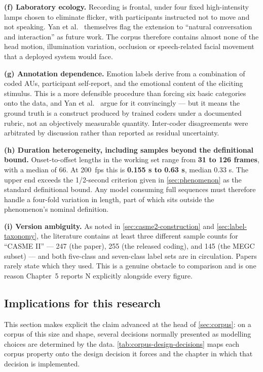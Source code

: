 \textbf{(f) Laboratory ecology.} Recording is frontal, under four fixed high-intensity lamps chosen to eliminate flicker, with participants instructed not to move and not speaking. Yan et al.~\cite{yan2014} themselves flag the extension to ``natural conversation and interaction'' as future work. The corpus therefore contains almost none of the head motion, illumination variation, occlusion or speech-related facial movement that a deployed system would face.

\textbf{(g) Annotation dependence.} Emotion labels derive from a combination of coded AUs, participant self-report, and the emotional content of the eliciting stimulus. This is a more defensible procedure than forcing six basic categories onto the data, and Yan et al.~\cite{yan2014} argue for it convincingly --- but it means the ground truth is a construct produced by trained coders under a documented rubric, not an objectively measurable quantity. Inter-coder disagreements were arbitrated by discussion rather than reported as residual uncertainty.

\textbf{(h) Duration heterogeneity, including samples beyond the definitional bound.} Onset-to-offset lengths in the working set range from \textbf{31 to 126 frames}, with a median of 66. At 200~fps this is \textbf{0.155 s to 0.63 s}, median 0.33 s. The upper end exceeds the 1/2-second criterion given in \autoref{sec:phenomenon} as the standard definitional bound. Any model consuming full sequences must therefore handle a four-fold variation in length, part of which sits outside the phenomenon's nominal definition.

\textbf{(i) Version ambiguity.} As noted in \autoref{sec:casme2-construction} and \autoref{sec:label-taxonomy}, the literature contains at least three different sample counts for ``CASME II'' --- 247 (the paper), 255 (the released coding), and 145 (the MEGC subset) --- and both five-class and seven-class label sets are in circulation. Papers rarely state which they used. This is a genuine obstacle to comparison and is one reason Chapter~5 reports N explicitly alongside every figure.


\subsection{Implications for this research}
\label{sec:corpus-implications}

This section makes explicit the claim advanced at the head of \autoref{sec:corpus}: on a corpus of this size and shape, several decisions normally presented as modelling choices are determined by the data. \autoref{tab:corpus-design-decisions} maps each corpus property onto the design decision it forces and the chapter in which that decision is implemented.

